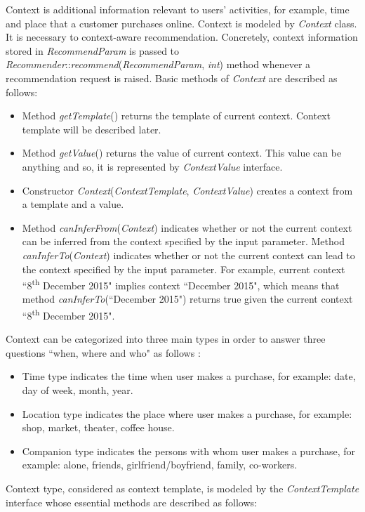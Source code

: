 \documentclass[a4paper,twoside]{article}
\begin{document}
Context is additional information relevant to users' activities, for example, time and place that a customer purchases online. Context is modeled by \textit{Context} class. It is necessary to context-aware recommendation. Concretely, context information stored in \textit{RecommendParam} is passed to \textit{Recommender}::\textit{recommend}(\textit{RecommendParam}, \textit{int}) method whenever a recommendation request is raised. Basic methods of \textit{Context} are described as follows:
\begin{itemize}
\item Method \textit{getTemplate}() returns the template of current context. Context template will be described later.
\item Method \textit{getValue}() returns the value of current context. This value can be anything and so, it is represented by \textit{ContextValue} interface.
\item Constructor \textit{Context}(\textit{ContextTemplate}, \textit{ContextValue}) creates a context from a template and a value.
\item Method \textit{canInferFrom}(\textit{Context}) indicates whether or not the current context can be inferred from the context specified by the input parameter. Method \textit{canInferTo}(\textit{Context}) indicates whether or not the current context can lead to the context specified by the input parameter. For example, current context ``8\textsuperscript{th} December 2015" implies context ``December 2015", which means that method \textit{canInferTo}(``December 2015") returns true given the current context ``8\textsuperscript{th} December 2015".
\end{itemize}
Context can be categorized into three main types in order to answer three questions ``when, where and who" as follows \cite[pp. 224-225]{ricci2011}:
\begin{itemize}
\item Time type indicates the time when user makes a purchase, for example: date, day of week, month, year.
\item Location type indicates the place where user makes a purchase, for example: shop, market, theater, coffee house.
\item Companion type indicates the persons with whom user makes a purchase, for example: alone, friends, girlfriend/boyfriend, family, co-workers.
\end{itemize}
Context type, considered as context template, is modeled by the \textit{ContextTemplate} interface whose essential methods are described as follows:
\end{document}
